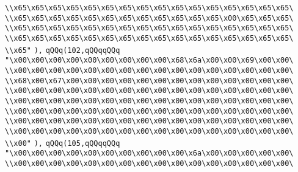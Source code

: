 \verb|\\x65\x65\x65\x65\x65\x65\x65\x65\x65\x65\x65\x65\x65\x65\x65\x65\|\newline
\verb|\\x65\x65\x65\x65\x65\x65\x65\x65\x65\x65\x65\x65\x00\x65\x65\x65\|\newline
\verb|\\x65\x65\x65\x65\x65\x65\x65\x65\x65\x65\x65\x65\x65\x65\x65\x65\|\newline
\verb|\\x65\x65\x65\x65\x65\x65\x65\x65\x65\x65\x65\x65\x65\x65\x65\x65\|\newline
\verb|\\x65"|\newline
\verb|),|\newline
\verb|qQQq(102,qQQqqQQq|\newline
\verb|"\x00\x00\x00\x00\x00\x00\x00\x00\x00\x68\x6a\x00\x00\x69\x00\x00\|\newline
\verb|\\x00\x00\x00\x00\x00\x00\x00\x00\x00\x00\x00\x00\x00\x00\x00\x00\|\newline
\verb|\\x68\x00\x67\x00\x00\x00\x00\x00\x00\x00\x00\x00\x00\x00\x00\x00\|\newline
\verb|\\x00\x00\x00\x00\x00\x00\x00\x00\x00\x00\x00\x00\x00\x00\x00\x00\|\newline
\verb|\\x00\x00\x00\x00\x00\x00\x00\x00\x00\x00\x00\x00\x00\x00\x00\x00\|\newline
\verb|\\x00\x00\x00\x00\x00\x00\x00\x00\x00\x00\x00\x00\x00\x00\x00\x00\|\newline
\verb|\\x00\x00\x00\x00\x00\x00\x00\x00\x00\x00\x00\x00\x00\x00\x00\x00\|\newline
\verb|\\x00\x00\x00\x00\x00\x00\x00\x00\x00\x00\x00\x00\x00\x00\x00\x00\|\newline
\verb|\\x00"|\newline
\verb|),|\newline
\verb|qQQq(105,qQQqqQQq|\newline
\verb|"\x00\x00\x00\x00\x00\x00\x00\x00\x00\x00\x6a\x00\x00\x00\x00\x00\|\newline
\verb|\\x00\x00\x00\x00\x00\x00\x00\x00\x00\x00\x00\x00\x00\x00\x00\x00\|\newline
